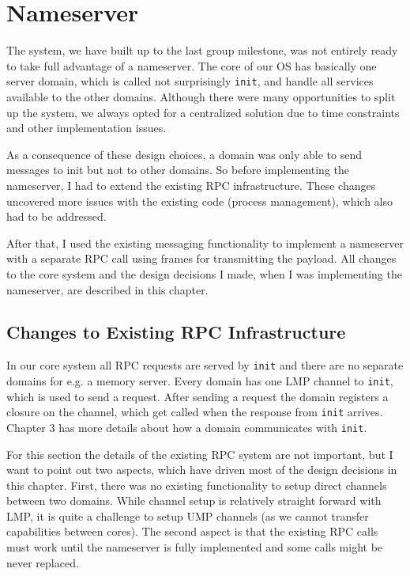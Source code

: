 \chapter{Nameserver}

The system, we have built up to the last group milestone, was not 
entirely ready to take full advantage of a nameserver. The core of our OS
has basically one server domain, which is called not surprisingly \verb|init|, 
and handle all services available to the other domains. Although there were
many opportunities to split up the system, we always opted for a centralized 
solution due to time constraints and other implementation issues.

As a consequence of these design choices, a domain was only able to send messages 
to init but not to other domains. So before implementing the nameserver, I had to
extend the existing RPC infrastructure. These changes uncovered more issues with
the existing code (process management), which also had to be addressed.

After that, I used the existing messaging functionality to implement a nameserver
with a separate RPC call using frames for transmitting the payload. All changes
to the core system and the design decisions I made, when I was implementing the
nameserver, are described in this chapter.

\section{Changes to Existing RPC Infrastructure}

In our core system all RPC requests are served by \verb|init| and there are no separate
domains for e.g. a memory server. Every domain has one LMP channel to \verb|init|, which
is used to send a request. After sending a request the domain registers a closure on the
channel, which get called when the response from \verb|init| arrives. Chapter 3 has more
details about how a domain communicates with \verb|init|.

For this section the details of the existing RPC system are not important, but I want to
point out two aspects, which have driven most of the design decisions in this chapter. 
First, there was no existing functionality to setup direct channels between two domains.
While channel setup is relatively straight forward with LMP, it is quite a challenge to
setup UMP channels (as we cannot transfer capabilities between cores).
The second aspect is that the existing RPC calls must work until the nameserver is fully
implemented and some calls might be never replaced.


